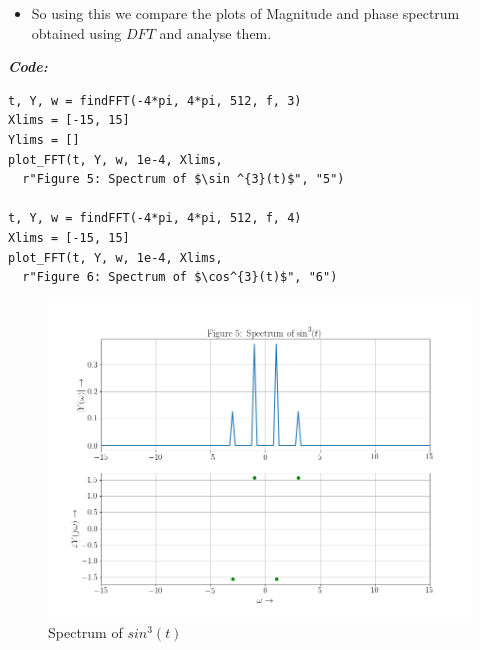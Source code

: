 \documentclass[11pt, a4paper]{article}
\begin{document}
\begin{itemize}

\item
  So using this we compare the plots of Magnitude and phase spectrum
  obtained using \(DFT\) and analyse them.
\end{itemize}

\textit{\textbf{Code:}}
   \begin{lstlisting}
t, Y, w = findFFT(-4*pi, 4*pi, 512, f, 3)
Xlims = [-15, 15]
Ylims = []
plot_FFT(t, Y, w, 1e-4, Xlims, 
  r"Figure 5: Spectrum of $\sin ^{3}(t)$", "5")

t, Y, w = findFFT(-4*pi, 4*pi, 512, f, 4)
Xlims = [-15, 15]
plot_FFT(t, Y, w, 1e-4, Xlims, 
  r"Figure 6: Spectrum of $\cos^{3}(t)$", "6")

  \end{lstlisting}
   \newpage
   \begin{figure}[!tbh]
    \centering
    \includegraphics[scale=0.5]{./../Extras/fig9-5.png}  %
   \caption{Spectrum of $sin^{3}(t)$}
  \end{figure}
  \newpage
\end{document}
